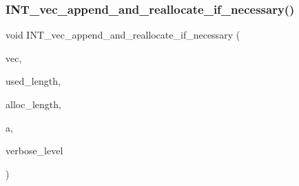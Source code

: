\mbox{\label{sorting_8_c_a246292dca918fab53cf46d9aaa5b88fa}} 
\subsubsection{\texorpdfstring{I\+N\+T\+\_\+vec\+\_\+append\+\_\+and\+\_\+reallocate\+\_\+if\+\_\+necessary()}{INT\_vec\_append\_and\_reallocate\_if\_necessary()}}
{\footnotesize\ttfamily void I\+N\+T\+\_\+vec\+\_\+append\+\_\+and\+\_\+reallocate\+\_\+if\+\_\+necessary (\begin{DoxyParamCaption}\item[{\mbox{\hyperlink{galois_8h_a09fddde158a3a20bd2dcadb609de11dc}{I\+NT}} $\ast$\&}]{vec,  }\item[{\mbox{\hyperlink{galois_8h_a09fddde158a3a20bd2dcadb609de11dc}{I\+NT}} \&}]{used\+\_\+length,  }\item[{\mbox{\hyperlink{galois_8h_a09fddde158a3a20bd2dcadb609de11dc}{I\+NT}} \&}]{alloc\+\_\+length,  }\item[{\mbox{\hyperlink{galois_8h_a09fddde158a3a20bd2dcadb609de11dc}{I\+NT}}}]{a,  }\item[{\mbox{\hyperlink{galois_8h_a09fddde158a3a20bd2dcadb609de11dc}{I\+NT}}}]{verbose\+\_\+level }\end{DoxyParamCaption})}

\mbox{\label{sorting_8_c_ad4176bee048e4f036f8b9d6dd986e0f9}} 
